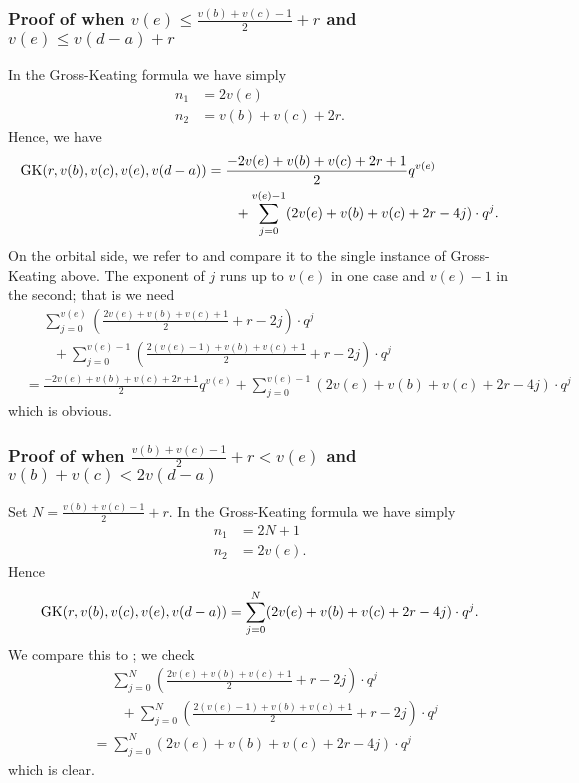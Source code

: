 \subsubsection{Proof of 
  when $v(e) \le \tfrac{v(b)+v(c)-1}{2} + r$
  and $v(e) \le v(d-a) + r$}
In the Gross-Keating formula we have simply
\begin{align*}
  n_1 &= 2v(e) \\
  n_2 &= v(b) + v(c) + 2r.
\end{align*}
Hence, we have
\begin{align*}
  \operatorname{GK}(r, v(b), v(c), v(e), v(d-a))
  &= \frac{-2v(e)+v(b)+v(c)+2r+1}{2} q^{v(e)} \\
  &\qquad+ \sum_{j=0}^{v(e)-1} (2v(e)+v(b)+v(c)+2r-4j) \cdot q^j.
\end{align*}
On the orbital side, we refer to 
and compare it to the single instance of Gross-Keating above.
The exponent of $j$ runs up to $v(e)$ in one case and $v(e)-1$ in the second;
that is we need
\begin{align*}
  &\phantom= \sum_{j=0}^{v(e)} \left( \frac{2v(e)+v(b)+v(c)+1}{2} + r - 2j \right) \cdot q^j \\
  &\qquad+ \sum_{j=0}^{v(e)-1} \left( \frac{2(v(e)-1)+v(b)+v(c)+1}{2} + r - 2j \right) \cdot q^j \\
  &= \frac{-2v(e)+v(b)+v(c)+2r+1}{2} q^{v(e)}
  + \sum_{j=0}^{v(e)-1} (2v(e)+v(b)+v(c)+2r-4j) \cdot q^j
\end{align*}
which is obvious.

\subsubsection{Proof of 
  when $\tfrac{v(b)+v(c)-1}{2} + r < v(e)$
  and $v(b)+v(c) < 2v(d-a)$}

Set $N = \frac{v(b)+v(c)-1}{2} + r$.
In the Gross-Keating formula we have simply
\begin{align*}
  n_1 &= 2N+1 \\
  n_2 &= 2v(e).
\end{align*}
Hence
\[ \operatorname{GK}(r, v(b), v(c), v(e), v(d-a))
  = \sum_{j=0}^N (2v(e)+v(b)+v(c)+2r-4j) \cdot q^j. \]
We compare this to ; we check
\begin{align*}
  &\phantom= \sum_{j=0}^{N} \left( \frac{2v(e)+v(b)+v(c)+1}{2} + r - 2j \right) \cdot q^j \\
  &\qquad+ \sum_{j=0}^{N} \left( \frac{2(v(e)-1)+v(b)+v(c)+1}{2} + r - 2j \right) \cdot q^j \\
  &= \sum_{j=0}^N (2v(e)+v(b)+v(c)+2r-4j) \cdot q^j
\end{align*}
which is clear.

